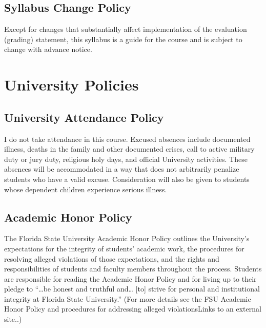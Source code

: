 \documentclass[10pt,]{article}
\begin{document}
\hypertarget{syllabus-change-policy}{%
\subsection{Syllabus Change Policy}\label{syllabus-change-policy}}

Except for changes that substantially affect implementation of the
evaluation (grading) statement, this syllabus is a guide for the course
and is subject to change with advance notice.

\hypertarget{university-policies}{%
\section{University Policies}\label{university-policies}}

\hypertarget{university-attendance-policy}{%
\subsection{University Attendance
Policy}\label{university-attendance-policy}}

I do not take attendance in this course. Excused absences include
documented illness, deaths in the family and other documented crises,
call to active military duty or jury duty, religious holy days, and
official University activities. These absences will be accommodated in a
way that does not arbitrarily penalize students who have a valid excuse.
Consideration will also be given to students whose dependent children
experience serious illness.

\hypertarget{academic-honor-policy}{%
\subsection{Academic Honor Policy}\label{academic-honor-policy}}

The Florida State University Academic Honor Policy outlines the
University's expectations for the integrity of students' academic work,
the procedures for resolving alleged violations of those expectations,
and the rights and responsibilities of students and faculty members
throughout the process. Students are responsible for reading the
Academic Honor Policy and for living up to their pledge to ``\ldots be
honest and truthful and\ldots{} {[}to{]} strive for personal and
institutional integrity at Florida State University.'' (For more details
see the FSU Academic Honor Policy and procedures for addressing alleged
violationsLinks to an external site..)
\end{document}
